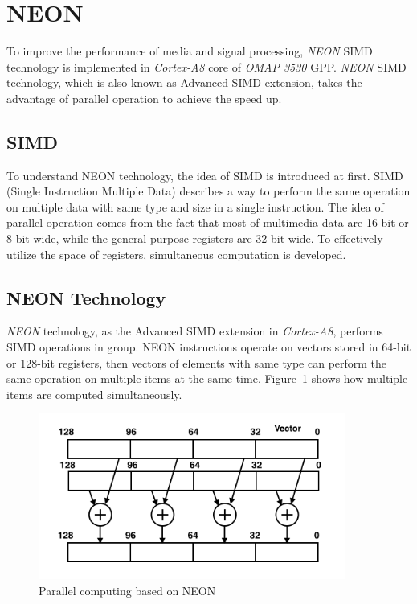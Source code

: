 \section{NEON}
To improve the performance of media and signal processing, 
\emph{NEON} SIMD technology is implemented in \emph{Cortex-A8} core of \emph{OMAP 3530} GPP. 
\emph{NEON} SIMD technology, which is also known as Advanced SIMD extension, 
takes the advantage of parallel operation to achieve the speed up.
\subsection{SIMD}
To understand NEON technology, the idea of SIMD is introduced at first. 
SIMD (Single Instruction Multiple Data) describes a way to perform the same operation on multiple data with same type and size in a single instruction. 
The idea of parallel operation comes from the fact that most of multimedia data are 16-bit or 8-bit wide, while the general purpose registers are 32-bit wide. 
To effectively utilize the space of registers, simultaneous computation is developed.  
\subsection{NEON Technology} 
\emph{NEON} technology, as the Advanced SIMD extension in \emph{Cortex-A8}, performs SIMD operations in group. 
NEON instructions operate on vectors stored in 64-bit or 128-bit registers, 
then vectors of elements with same type can perform the same operation on multiple items at the same time.
Figure~\ref{fig:neon} shows how multiple items are computed simultaneously. 

\begin{figure}[h]
\centering
\includegraphics[width=0.9\textwidth]{images/neon}
\caption{Parallel computing based on NEON}
\label{fig:neon}
\end{figure}

